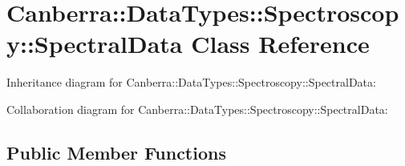 \hypertarget{class_canberra_1_1_data_types_1_1_spectroscopy_1_1_spectral_data}{}\section{Canberra\+:\+:Data\+Types\+:\+:Spectroscopy\+:\+:Spectral\+Data Class Reference}
\label{class_canberra_1_1_data_types_1_1_spectroscopy_1_1_spectral_data}


Inheritance diagram for Canberra\+:\+:Data\+Types\+:\+:Spectroscopy\+:\+:Spectral\+Data\+:


Collaboration diagram for Canberra\+:\+:Data\+Types\+:\+:Spectroscopy\+:\+:Spectral\+Data\+:
\subsection*{Public Member Functions}
